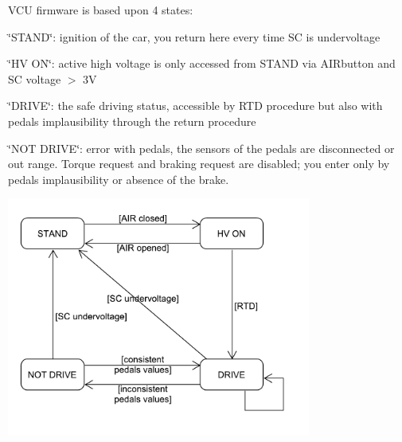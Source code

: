 V\+CU firmware is based upon 4 states\+:
\begin{DoxyItemize}
\item \label{_f_s_m_page_STAND}%
%
\char`\"{}\+S\+T\+A\+N\+D\char`\"{}\+: ignition of the car, you return here every time SC is undervoltage
\item \label{_f_s_m_page_HVON}%
%
\char`\"{}\+H\+V O\+N\char`\"{}\+: active high voltage is only accessed from S\+T\+A\+ND via A\+I\+Rbutton and SC voltage $>$ 3V
\item \label{_f_s_m_page_DRIVE}%
%
\char`\"{}\+D\+R\+I\+V\+E\char`\"{}\+: the safe driving status, accessible by R\+TD procedure but also with pedals implausibility through the return procedure
\item \label{_f_s_m_page_NOTDRIVE}%
%
\char`\"{}\+N\+O\+T D\+R\+I\+V\+E\char`\"{}\+: error with pedals, the sensors of the pedals are disconnected or out range. Torque request and braking request are disabled; you enter only by pedals implausibility or absence of the brake.
\end{DoxyItemize}

 
\begin{DoxyImage}
\includegraphics[width=10cm]{fsm_diagram}
\end{DoxyImage}
 
